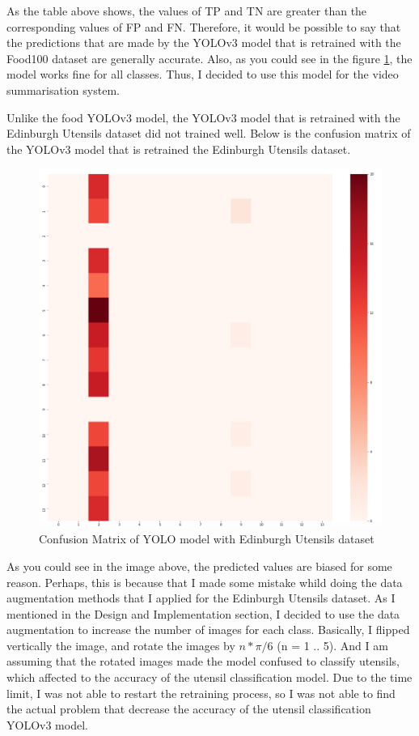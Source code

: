 \documentclass{article}
\begin{document}
As the table above shows, the values of TP and TN are greater than the corresponding values of FP and FN. Therefore, it would be possible to say that the predictions that are made by the YOLOv3 model that is retrained with the Food100 dataset are generally accurate. Also, as you could see in the figure \ref{fig:cm_food100}, the model works fine for all classes. Thus, I decided to use this model for the video summarisation system.

Unlike the food YOLOv3 model, the YOLOv3 model that is retrained with the Edinburgh Utensils dataset did not trained well. Below is the confusion matrix of the YOLOv3 model that is retrained the Edinburgh Utensils dataset.

\begin{figure}[H]
    \centering
    \includegraphics[scale=0.4]{imgs/cm_utensils.png}
    \caption{Confusion Matrix of YOLO model with Edinburgh Utensils dataset}
    \label{fig:cm_food100}
\end{figure}

As you could see in the image above, the predicted values are biased for some reason. Perhaps, this is because that I made some mistake whild doing the data augmentation methods that I applied for the Edinburgh Utensils dataset. As I mentioned in the Design and Implementation section, I decided to use the data augmentation to increase the number of images for each class. Basically, I flipped vertically the image, and rotate the images by $n * \pi / 6$ (n = 1 .. 5). And I am assuming that the rotated images made the model confused to classify utensils, which affected to the accuracy of the utensil classification model. Due to the time limit, I was not able to restart the retraining process, so I was not able to find the actual problem that decrease the accuracy of the utensil classification YOLOv3 model.
\end{document}
